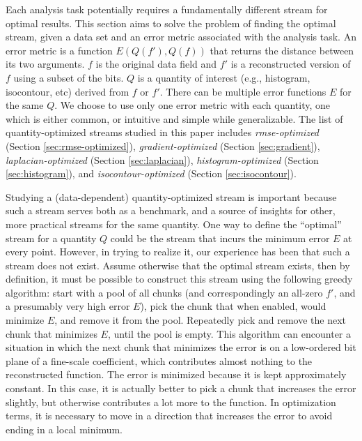 Each analysis task potentially requires a fundamentally different stream for optimal results. This
section aims to solve the problem of finding the optimal stream, given a data set and
an error metric associated with the analysis task. An error metric is a function
$E(Q(f'),Q(f))$ that returns the distance between its two arguments. $f$ is the original data field
and $f'$ is a reconstructed version of $f$ using a subset of the bits. $Q$ is a quantity of interest
(e.g., histogram, isocontour, etc) derived from $f$ or $f'$. There can be multiple error functions
$E$ for the same $Q$. We choose to use only one error metric with
each quantity, one which is either common, or intuitive and simple while generalizable.
The list of quantity-optimized streams studied in this paper includes \emph{rmse-optimized} (Section
\ref{sec:rmse-optimized}), \emph{gradient-optimized} (Section \ref{sec:gradient}),
\emph{laplacian-optimized} (Section \ref{sec:laplacian}), \emph{histogram-optimized} (Section
\ref{sec:histogram}), and \emph{isocontour-optimized} (Section \ref{sec:isocontour}).

Studying a (data-dependent) quantity-optimized stream is important because such a stream serves both
as a benchmark, and a source of insights for other, more practical streams for the same quantity.
One way to define the ``optimal'' stream for a quantity $Q$ could be the stream that incurs the
minimum error $E$ at every point. However, in trying to realize it, our experience has been that
such a stream does not exist. Assume otherwise that the optimal stream exists, then by definition,
it must be possible to construct this stream using the following greedy algorithm: start with a pool
of all chunks (and correspondingly an all-zero $f'$, and a presumably very high error $E$), pick
the chunk that when enabled, would minimize $E$, and remove it from the pool. Repeatedly pick and
remove the next chunk that minimizes $E$, until the pool is empty. This algorithm can
encounter a situation in which the next chunk that minimizes the error is on a low-ordered bit plane
of a fine-scale coefficient, which contributes almost nothing to the reconstructed function. The
error is minimized because it is kept approximately constant. In this case, it is actually better to
pick a chunk that increases the error slightly, but otherwise contributes a lot more to the
function. In optimization terms, it is necessary to move in a direction that increases the error to
avoid ending in a local minimum.

